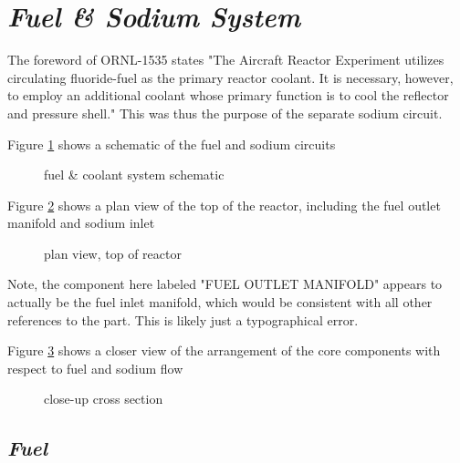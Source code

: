 \documentclass[ms,a4paper]{memoir}
\newcommand*{\msrarchive}{../../msr-archive}%
\begin{document}
\section{\emph{Fuel \& Sodium System}}

The foreword of ORNL-1535 states "The Aircraft Reactor Experiment utilizes circulating fluoride-fuel as the primary reactor coolant. It is necessary, however, to employ an additional coolant whose primary function is to cool the reflector and pressure shell." This was thus the purpose of the separate sodium circuit.

Figure \ref{fig3} shows a schematic of the fuel and sodium circuits

\begin{figure}[H]
  \centering
  \caption{fuel \& coolant system schematic \parencite[Figure 2.3]{ornl-1845}}
  \label{fig3}
\end{figure}

Figure \ref{fig6} shows a plan view of the top of the reactor, including the fuel outlet manifold and sodium inlet

\begin{figure}[H]
  \centering
  \caption{plan view, top of reactor \parencite[Figure 12]{ornl-1535}}
  \label{fig6}
\end{figure}

Note, the component here labeled "FUEL OUTLET MANIFOLD" appears to actually be the fuel inlet manifold, which would be consistent with all other references to the part. This is likely just a typographical error.

Figure \ref{fig7} shows a closer view of the arrangement of the core components with respect to fuel and sodium flow

\begin{figure}[H]
  \centering
  \caption{close-up cross section \parencite[Figure 14]{ornl-1535}}
  \label{fig7}
\end{figure}

\subsection{\emph{Fuel}}
\end{document}
